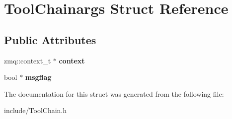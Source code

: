 \hypertarget{structToolChainargs}{\section{Tool\-Chainargs Struct Reference}
\label{structToolChainargs}
}
\subsection*{Public Attributes}
\begin{DoxyCompactItemize}
\item 
\hypertarget{structToolChainargs_a288a3015acf712919f128c216eecadad}{zmq\-::context\-\_\-t $\ast$ {\bfseries context}}\label{structToolChainargs_a288a3015acf712919f128c216eecadad}

\item 
\hypertarget{structToolChainargs_a3551269b039d543b844a2d0d924ce96b}{bool $\ast$ {\bfseries msgflag}}\label{structToolChainargs_a3551269b039d543b844a2d0d924ce96b}

\end{DoxyCompactItemize}


The documentation for this struct was generated from the following file\-:\begin{DoxyCompactItemize}
\item 
include/Tool\-Chain.\-h\end{DoxyCompactItemize}
